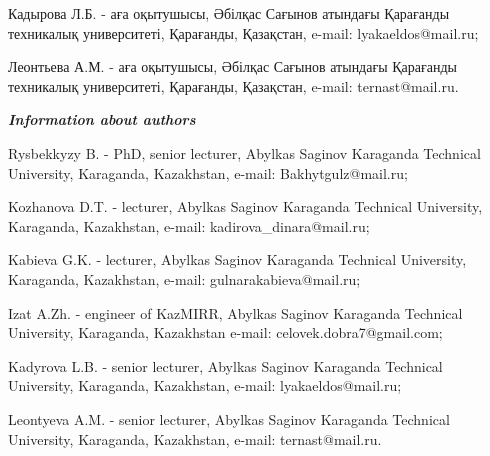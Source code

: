 Кадырова Л.Б. - аға оқытушысы, Әбілқас Сағынов атындағы Қарағанды
техникалық университеті, Қарағанды, Қазақстан, e-mail:
lyakaeldos@mail.ru;

Леонтьева А.М. - аға оқытушысы, Әбілқас Сағынов атындағы Қарағанды
техникалық университеті, Қарағанды, Қазақстан, e-mail: ternast@mail.ru.

\emph{{\bfseries Information about authors}}

Rysbekkyzy B. - PhD, senior lecturer, Abylkas Saginov Karaganda
Technical University, Karaganda, Kazakhstan, e-mail: Bakhytgulz@mail.ru;

Kozhanova D.T. - lecturer, Abylkas Saginov Karaganda Technical
University, Karaganda, Kazakhstan, e-mail: kadirova\_dinara@mail.ru;

Kabieva G.K. - lecturer, Abylkas Saginov Karaganda Technical University,
Karaganda, Kazakhstan, e-mail: gulnarakabieva@mail.ru;

Izat A.Zh. - engineer of KazMIRR, Abylkas Saginov Karaganda Technical
University, Karaganda, Kazakhstan e-mail: celovek.dobra7@gmail.com;

Kadyrova L.B. - senior lecturer, Abylkas Saginov Karaganda Technical
University, Karaganda, Kazakhstan, e-mail: lyakaeldos@mail.ru;

Leontyeva A.M. - senior lecturer, Abylkas Saginov Karaganda Technical
University, Karaganda, Kazakhstan, e-mail: ternast@mail.ru.



